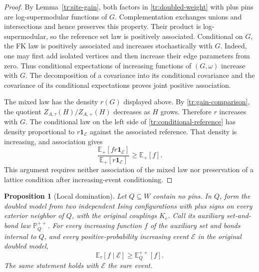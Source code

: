 \documentclass[11pt]{article}
\newtheorem{proposition}[theorem]{Proposition}
\theoremstyle{definition}
\theoremstyle{remark}
\numberwithin{equation}{section}
\begin{document}
\begin{proof}
By Lemma~\ref{tr:site-gain}, both factors in
\eqref{tr:doubled-weight} with plus pins are log-supermodular functions of
$G$. Complementation exchanges unions and intersections and hence
preserves this property. Their product is log-supermodular, so the
reference set law is positively associated. Conditional on $G$, the FK
law is positively associated and increases stochastically with $G$.
Indeed, one may first add isolated vertices and then increase their edge
parameters from zero. Thus conditional expectations of increasing
functions of $(G,\omega)$ increase with $G$. The decomposition of a
covariance into its conditional covariance and the covariance of its
conditional expectations proves joint positive association.

The mixed law has the density $r(G)$ displayed above.
By \eqref{tr:gain-comparison}, the quotient $Z_{A,\tau}(H)/Z_{A,+}(H)$
decreases as $H$ grows. Therefore $r$ increases with $G$. The conditional
law on the left side of \eqref{tr:conditional-reference} has density
proportional to $r\mathbf1_{\mathcal E}$ against the associated reference.
That density is increasing, and association gives
\[
 \frac{\mathbb E_+[f r\mathbf1_{\mathcal E}]}
 {\mathbb E_+[r\mathbf1_{\mathcal E}]}
 \geq\mathbb E_+[f].
\]
This argument requires neither association of the mixed law nor
preservation of a lattice condition after increasing-event conditioning.
\end{proof}

\begin{proposition}[Local domination]
\label{tr:local-domination}
Let $Q\subseteq W$ contain no pins. In $Q$, form the doubled model from two
independent Ising configurations with plus signs on every exterior
neighbor of $Q$, with the original couplings $K_e$. Call its auxiliary
set-and-bond law $\mathbb P_Q^{++}$. For every increasing function $f$ of
the auxiliary set and bonds internal to $Q$, and every positive-probability
increasing event $\mathcal E$ in the original doubled model,
\begin{equation}
\label{tr:local-domination-eq}
 \mathbb E_\tau[f\mid\mathcal E]\geq\mathbb E_Q^{++}[f].
\end{equation}
The same statement holds with $\mathcal E$ the sure event.
\end{proposition}
\end{document}
